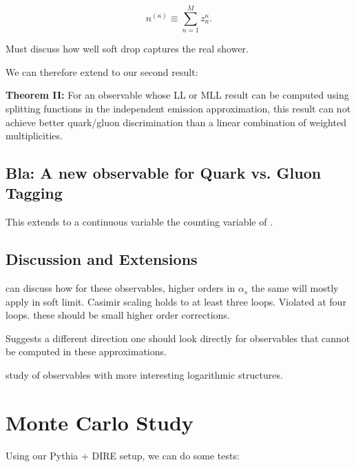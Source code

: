 \documentclass[letterpaper,11pt]{article}
\begin{document}
\begin{equation}
n^{(\kappa)} \equiv \sum_{n=1}^M z_n^\kappa.
\end{equation}

Must discuss how well soft drop captures the real shower.

We can therefore extend to our second result:

\vspace{1cm}
{\bf Theorem II:} For an observable whose LL or MLL result can be computed using splitting functions in the independent emission approximation, this result can not achieve better quark/gluon discrimination than a linear combination of weighted multiplicities.
\vspace{1cm}


\subsection{Bla: A new observable for Quark vs. Gluon Tagging}
\label{sec:new_obs}

This extends to a continuous variable the counting variable of \cite{Frye:2017yrw}.


\subsection{Discussion and Extensions}
\label{sec:discuss}

can discuss how for these observables, higher orders in $\alpha_s$ the same will mostly apply in soft limit. Casimir scaling holds to at least three loops. Violated at four loops\cite{Armoni:2006ux}\cite{Boels:2017skl}.\cite{Grozin:2017css} \cite{Moch:2017uml} these should be small higher order corrections.

Suggests a different direction one should look directly for observables that cannot be computed in these approximations.

study of observables with more interesting logarithmic structures.

\section{Monte Carlo Study}
\label{sec:squirrelemperical}

Using our Pythia + DIRE setup, we can do some tests:
\end{document}
